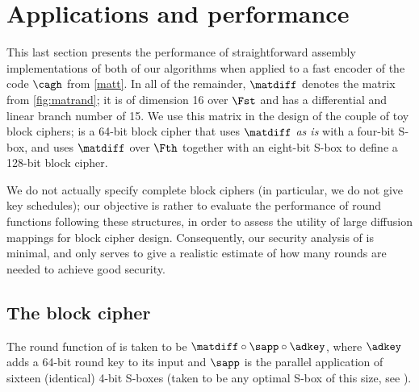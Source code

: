 \section{Applications and performance}
\label{sec:appli}

This last section presents the performance of straightforward assembly implementations of both of our
algorithms when applied to a fast encoder of the code $\cagh$ from \autoref{matt}.
In all of the remainder, $\matdiff$ denotes the matrix from \autoref{fig:matrand}; it is
of dimension 16 over $\Fst$ and has a differential and linear branch number of 15.
We use this matrix in the design of the \samneric couple of toy block ciphers; \sam
is a 64-bit block cipher that uses $\matdiff$ \emph{as is} with a four-bit S-box,
and \eric uses $\matdiff$ over $\Fth$ together with an eight-bit S-box to define
a 128-bit block cipher.

We do not actually specify complete block ciphers (in particular, we do not
give key schedules); our objective is rather to evaluate the performance
of round functions following these structures, in order to assess the utility
of large diffusion mappings for block cipher design. Consequently, our security
analysis of \samneric is minimal, and only serves to give a realistic estimate
of how many rounds are needed to achieve good security. 


\subsection{The \sam block cipher}
The round function of \sam is taken to be $\matdiff \circ \sapp \circ \adkey$, where $\adkey$ adds
a 64-bit round key to its input and $\sapp$ is the parallel application of sixteen (identical)
4-bit S-boxes (taken to be any optimal S-box of this size, see \eg \cite{4bit1,4bit2}).


